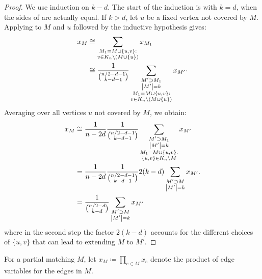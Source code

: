 \begin{proof}
We use induction on \(k - d\).
The start of the induction is with \(k = d\),
when the sides of 
are actually equal. If \(k > d\), let \(u\) be a fixed vertex not covered by \(M\).
Applying  to \(M\) and \(u\)
followed by the inductive hypothesis gives:
\begin{equation*}
	\begin{split}
    x_{M}
    &\cong
    \sum_{\substack{M_{1} = M \cup \{u,v\}: \\
        v \in K_{n} \setminus (M \cup \{u\})}}
    x_{M_{1}} \\
    &\cong
    \frac{1}{\binom{n/2 - d - 1}{k - d - 1}}
    \sum_{\substack{
        M' \supset M_{1} \\ \left|M'\right| = k \\
        M_{1} = M \cup \{u,v\}: \\
        v \in K_{n} \setminus (M \cup \{u\})}}
    x_{M'}
    \end{split}
    .
\end{equation*}
Averaging over all vertices \(u\) not covered by \(M\),
we obtain:
\begin{equation*}
  \begin{split}
  x_{M}
  &\cong
  \frac{1}{n - 2 d}
  \frac{1}{\binom{n/2 - d - 1}{k - d - 1}}
  \sum_{\substack{
      M' \supset M_{1} \\ \left|M'\right| = k \\
      M_{1} = M \cup \{u,v\}: \\
      \{u, v\} \in K_{n} \setminus M}}
  x_{M'} \\
  &=
  \frac{1}{n - 2 d}
  \frac{1}{\binom{n/2 - d - 1}{k - d - 1}}
  2 (k - d)
  \sum_{\substack{
      M' \supset M \\ \left|M'\right| = k}}
  x_{M'} \\
  &=
  \frac{1}{\binom{n/2 - d}{k - d}}
  \sum_{\substack{M' \supset M \\ \left|M'\right| = k}}
  x_{M'}
  \end{split}
  .
\end{equation*}
where in the second step the factor \(2(k - d)\) accounts for the different choices of $\{u,v\}$ that can lead to extending $M$ to $M'$.
\end{proof}
For a partial matching \(M\),
let \(x_{M} \coloneqq \prod_{e \in M} x_{e}\)
denote the product of edge variables for the edges in \(M\).

